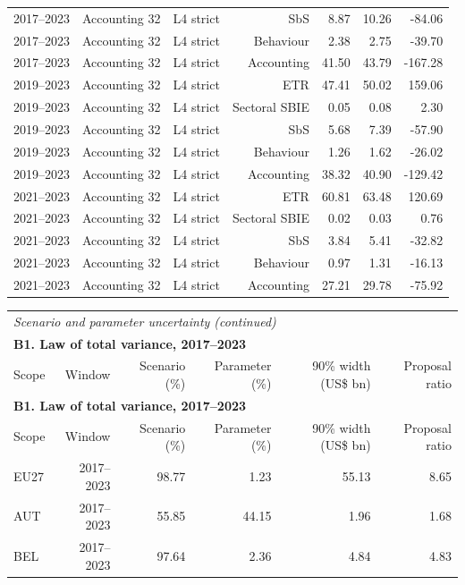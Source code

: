 {\begin{longtable}{@{}lrrrrrr@{}}
2017–2023 & Accounting 32 & L4 strict & SbS &  8.87 & 10.26 &  -84.06 \\
2017–2023 & Accounting 32 & L4 strict & Behaviour &  2.38 &  2.75 &  -39.70 \\
2017–2023 & Accounting 32 & L4 strict & Accounting & 41.50 & 43.79 & -167.28 \\
2019–2023 & Accounting 32 & L4 strict & ETR & 47.41 & 50.02 &  159.06 \\
2019–2023 & Accounting 32 & L4 strict & Sectoral SBIE &  0.05 &  0.08 &    2.30 \\
2019–2023 & Accounting 32 & L4 strict & SbS &  5.68 &  7.39 &  -57.90 \\
2019–2023 & Accounting 32 & L4 strict & Behaviour &  1.26 &  1.62 &  -26.02 \\
2019–2023 & Accounting 32 & L4 strict & Accounting & 38.32 & 40.90 & -129.42 \\
2021–2023 & Accounting 32 & L4 strict & ETR & 60.81 & 63.48 &  120.69 \\
2021–2023 & Accounting 32 & L4 strict & Sectoral SBIE &  0.02 &  0.03 &    0.76 \\
2021–2023 & Accounting 32 & L4 strict & SbS &  3.84 &  5.41 &  -32.82 \\
2021–2023 & Accounting 32 & L4 strict & Behaviour &  0.97 &  1.31 &  -16.13 \\
2021–2023 & Accounting 32 & L4 strict & Accounting & 27.21 & 29.78 &  -75.92 \\
\end{longtable}
\addtocounter{table}{-1}
\begin{longtable}{@{}lrrrrr@{}}
\multicolumn{6}{l}{\textit{Scenario and parameter uncertainty (continued)}} \\
\multicolumn{6}{l}{\textbf{B1. Law of total variance, 2017–2023}} \\
\toprule
Scope & Window & Scenario (\%) & Parameter (\%) & 90\% width (US\$ bn) & Proposal ratio \\
\midrule
\endfirsthead
\multicolumn{6}{l}{\textbf{B1. Law of total variance, 2017–2023}} \\
\toprule
Scope & Window & Scenario (\%) & Parameter (\%) & 90\% width (US\$ bn) & Proposal ratio \\
\midrule
\endhead
\midrule
\endfoot
\bottomrule
\endlastfoot
EU27 & 2017–2023 & 98.77 &  1.23 & 55.13 &  8.65 \\
AUT & 2017–2023 & 55.85 & 44.15 &  1.96 &  1.68 \\
BEL & 2017–2023 & 97.64 &  2.36 &  4.84 &  4.83 \\

\end{longtable}}
